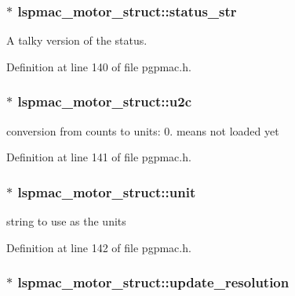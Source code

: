 \hypertarget{structlspmac__motor__struct_aa0a6bed8379c5b1f90a4eb826cde9136}{
\subsubsection[{status\-\_\-str}]{$\ast$ lspmac\-\_\-motor\-\_\-struct\-::status\-\_\-str}}\label{structlspmac__motor__struct_aa0a6bed8379c5b1f90a4eb826cde9136}


A talky version of the status. 



Definition at line 140 of file pgpmac.\-h.

\hypertarget{structlspmac__motor__struct_a8838915ebb6f9989944117c8197d5e86}{
\subsubsection[{u2c}]{$\ast$ lspmac\-\_\-motor\-\_\-struct\-::u2c}}\label{structlspmac__motor__struct_a8838915ebb6f9989944117c8197d5e86}


conversion from counts to units\-: 0. means not loaded yet 



Definition at line 141 of file pgpmac.\-h.

\hypertarget{structlspmac__motor__struct_af8e6eb1df6b0d343fc4da93fbdd63133}{
\subsubsection[{unit}]{$\ast$ lspmac\-\_\-motor\-\_\-struct\-::unit}}\label{structlspmac__motor__struct_af8e6eb1df6b0d343fc4da93fbdd63133}


string to use as the units 



Definition at line 142 of file pgpmac.\-h.

\hypertarget{structlspmac__motor__struct_aefa84c7592369090eec8b211caaa3a51}{
\subsubsection[{update\-\_\-resolution}]{$\ast$ lspmac\-\_\-motor\-\_\-struct\-::update\-\_\-resolution}}\label{structlspmac__motor__struct_aefa84c7592369090eec8b211caaa3a51}


